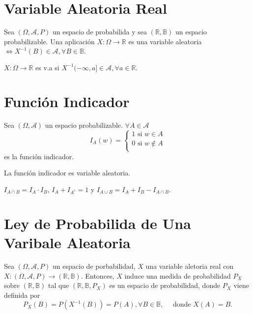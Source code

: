 \section{Variable Aleatoria Real}

\begin{defn}
  Sea $(\Omega, \mathcal{A}, P )$ un espacio de probabilida y sea $( \mathbb{R}, \mathbb{B})$ un espacio probabilizable. Una aplicación $X : \Omega \to \mathbb{R}$ es una variable aleatoria $\Leftrightarrow X^{-1}(B) \in \mathcal{A}, \forall B \in \mathbb{B}$.
\end{defn}

\begin{prop}
  $X :  \Omega \to \mathbb{R}$ es v.a si $X^{-1}(-\infty,a] \in \mathcal{A}, \forall a \in \mathbb{R}$.
\end{prop}

\section{Función Indicador}

\begin{defn}
  Sea $(\Omega, \mathcal{A})$ un espacio probabilizable. $\forall A \in \mathcal{A}$
  \[ 
    I_{A}(w) =
    \begin{cases}
      1 \text{ si } w \in A \\
      0 \text{ si } w \not \in A \\
    \end{cases} 
  \] 
  es la función indicador.
\end{defn}

\begin{obs}
  La función indicador es variable aleatoria.
\end{obs}

\begin{obs}
  $I_{A \cap B} = I_{A} \cdot I_{B}$, $I_{A} + I_{A^{c}} = 1$ y $I_{A \cup B} = I_{A} + I_{B} - I_{A \cap B}$.
\end{obs}

\section{Ley de Probabilida de Una Varibale Aleatoria}

\begin{prop}
  Sea $(\Omega, \mathcal{A}, P )$ un espacio de porbabilidad, $X$ una variable aletoria real con $X : (\Omega, \mathcal{A}, P ) \to (\mathbb{R}, \mathbb{B})$. Entonces, $X$ induce una medida de probabilidad $P_{X}$ sobre $(\mathbb{R}, \mathbb{B})$ tal que $(\mathbb{R}, \mathbb{B}, P_{X})$ es un espacio de probabilidad, donde $P_{X}$ viene definida por
  \[
    P_{X}(B) = P(X^{-1}(B)) = P(A), \forall B \in \mathbb{B}, \quad \text{ donde } X(A) = B.
  \]
\end{prop}

